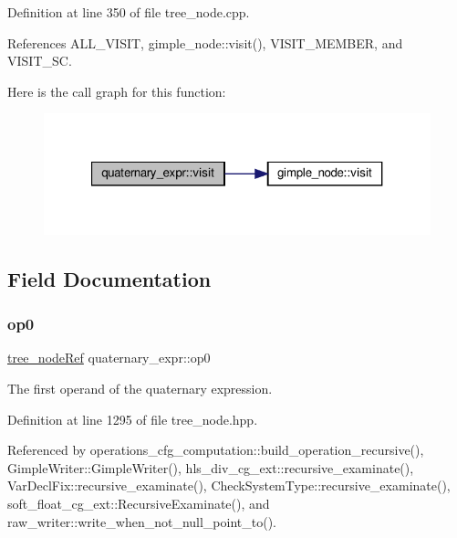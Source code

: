 Definition at line 350 of file tree\+\_\+node.\+cpp.



References A\+L\+L\+\_\+\+V\+I\+S\+IT, gimple\+\_\+node\+::visit(), V\+I\+S\+I\+T\+\_\+\+M\+E\+M\+B\+ER, and V\+I\+S\+I\+T\+\_\+\+SC.

Here is the call graph for this function\+:
\nopagebreak
\begin{figure}[H]
\begin{center}
\leavevmode
\includegraphics[width=321pt]{d1/db9/structquaternary__expr_ad01a5f8cb89a8bc218aa66029faf2cde_cgraph}
\end{center}
\end{figure}


\subsection{Field Documentation}
\mbox{\label{structquaternary__expr_a81479ae8fd09563f3975ca92807aa97a}} 
\subsubsection{\texorpdfstring{op0}{op0}}
{\footnotesize\ttfamily \hyperlink{tree__node_8hpp_a6ee377554d1c4871ad66a337eaa67fd5}{tree\+\_\+node\+Ref} quaternary\+\_\+expr\+::op0}



The first operand of the quaternary expression. 



Definition at line 1295 of file tree\+\_\+node.\+hpp.



Referenced by operations\+\_\+cfg\+\_\+computation\+::build\+\_\+operation\+\_\+recursive(), Gimple\+Writer\+::\+Gimple\+Writer(), hls\+\_\+div\+\_\+cg\+\_\+ext\+::recursive\+\_\+examinate(), Var\+Decl\+Fix\+::recursive\+\_\+examinate(), Check\+System\+Type\+::recursive\+\_\+examinate(), soft\+\_\+float\+\_\+cg\+\_\+ext\+::\+Recursive\+Examinate(), and raw\+\_\+writer\+::write\+\_\+when\+\_\+not\+\_\+null\+\_\+point\+\_\+to().

